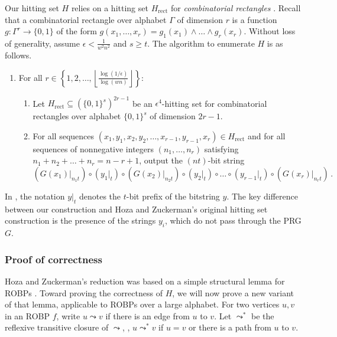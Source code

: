 \documentclass{toc}
\begin{document}
Our hitting set $H$ relies on a hitting set $H_{\text{rect}}$ for \emph{combinatorial rectangles} \cite{LLSZ97}. Recall that a combinatorial rectangle over alphabet $\Gamma$ of dimension $r$ is a function $g \colon \Gamma^r \to \{0, 1\}$ of the form $g(x_1, \dots, x_r) = g_1(x_1) \wedge \dots \wedge g_r(x_r)$. Without loss of generality, assume $\epsilon < \frac{1}{w^2 n^2}$ and $s \geq t$. The algorithm to enumerate $H$ is as follows.
\begin{enumerate}
\item For all $r \in \left\{1, 2, \dots, \left\lfloor \frac{\log(1/\epsilon)}{\log(wn)} \right\rfloor\right\}$:
\begin{enumerate}
\item Let $H_{\text{rect}} \subseteq (\{0, 1\}^s)^{2r - 1}$ be an $\epsilon^4$-hitting set for combinatorial rectangles over alphabet $\{0, 1\}^s$ of dimension $2r - 1$.
\item For all sequences $(x_1, y_1, x_2, y_2, \dots, x_{r - 1}, y_{r - 1}, x_r) \in H_{\text{rect}}$ and for all sequences of nonnegative integers $(n_1, \dots, n_r)$ satisfying $n_1 + n_2 + \dots + n_r = n - r + 1$, output the $(nt)$-bit string
\begin{equation} \label{eqn:large-alphabet-hz}
(G(x_1)|_{n_1 t}) \circ (y_1|_t) \circ (G(x_2)|_{n_2 t}) \circ (y_2|_t) \circ \dots \circ (y_{r - 1}|_t) \circ (G(x_r)|_{n_r t})\,.
\end{equation}
\end{enumerate}
\end{enumerate}
In , the notation $y|_t$ denotes the $t$-bit prefix of the bitstring $y$. The key difference between our construction and Hoza and Zuckerman's original hitting set construction \cite{HZ20} is the presence of the strings $y_i$, which do not pass through the PRG $G$.

\subsubsection{Proof of correctness}

Hoza and Zuckerman's reduction was based on a simple structural lemma for ROBPs \cite[Lemma 1]{HZ20}. Toward proving the correctness of $H$, we will now prove a new variant of that lemma, applicable to ROBPs over a large alphabet. For two vertices $u, v$ in an ROBP $f$, write $u \leadsto v$ if there is an edge from $u$ to $v$. Let $\leadsto^*$ be the reflexive transitive closure of $\leadsto$, \ie, $u \leadsto^* v$ if $u = v$ or there is a path from $u$ to $v$.
\end{document}
